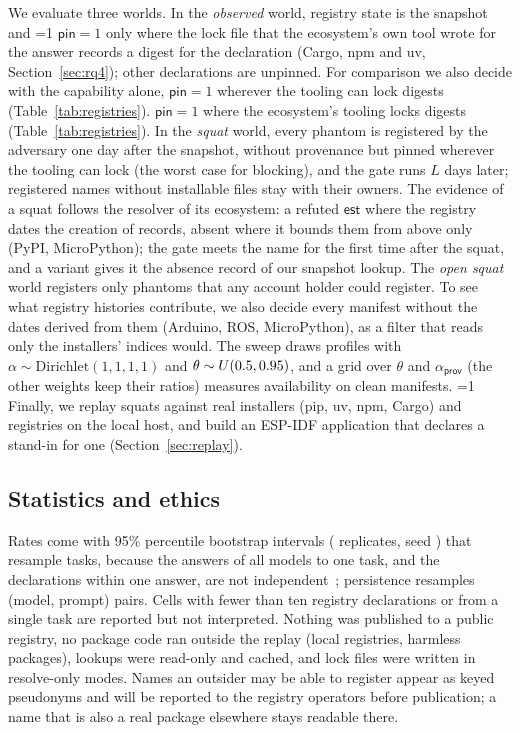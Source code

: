 \documentclass[conference]{IEEEtran}
\providecommand{\rHasReplay}{0}\providecommand{\rHasEspBuild}{0}\providecommand{\rRpNetns}{0}\providecommand{\rValByResponse}{0}\providecommand{\rNoPinBelowTheta}{0}\providecommand{\rHasLock}{0}\providecommand{\rHasAudit}{0}\providecommand{\rHasFamEq}{0}\providecommand{\rMainLock}{0}\providecommand{\rRpLockExec}{0}\providecommand{\rMaxAnsCut}{0}\providecommand{\rReqOnlyUrlPio}{0}\providecommand{\rReqPioSpan}{0}\providecommand{\rHistAfterPThreeUAdmit}{0}\providecommand{\rNGgufIsHorizon}{0}\providecommand{\rRemovedModel}{?}\providecommand{\rRemovedAnswers}{?}\providecommand{\rSqAbsRestOwned}{0}\providecommand{\rSqAbsRest}{0}\providecommand{\rNRemovedModels}{0}\providecommand{\rPostHorizonShiftSame}{0}
\newcommand{\sest}{\mathsf{est}}
\newcommand{\spin}{\mathsf{pin}}
\newcommand{\sprov}{\mathsf{prov}}
\begin{document}
We evaluate three worlds. In the \emph{observed} world, registry state is the snapshot and
\ifnum\rMainLock=1 $\spin=1$ only where the lock file that the ecosystem's own tool wrote for the answer records a
digest for the declaration (Cargo, npm and uv, Section~\ref{sec:rq4}); other declarations are unpinned. For
comparison we also decide with the capability alone, $\spin=1$ wherever the tooling can lock digests
(Table~\ref{tab:registries}). \else $\spin=1$ where the ecosystem's tooling locks digests
(Table~\ref{tab:registries}). \fi In the \emph{squat} world, every phantom is registered by the adversary one
day after the snapshot, without provenance but pinned wherever the tooling can lock (the worst case for blocking),
and the gate runs $L$ days later; registered names without installable files stay with their owners. The evidence of a squat follows the
resolver of its ecosystem: a refuted $\sest$ where the registry dates the creation of records, absent where it bounds
them from above only (PyPI, MicroPython); the gate meets the name for the first time after the squat, and a variant
gives it the absence record of our snapshot lookup. The \emph{open squat} world registers only phantoms that any
account holder could register. To see what registry histories contribute, we also decide every manifest without the
dates derived from them (Arduino, ROS, MicroPython), as a filter that reads only the installers' indices would. The
sweep draws \rSweepN{} profiles with $\alpha\sim\mathrm{Dirichlet}(1,1,1,1)$ and
$\theta\sim U(0.5,0.95)$, and a grid over $\theta$ and $\alpha_{\sprov}$ (the other weights
keep their ratios) measures availability on clean manifests.
\ifnum\rHasReplay=1
Finally, we replay squats against real installers (pip, uv, npm, Cargo) and registries on the local host, and build
an ESP-IDF application that declares a stand-in for one (Section~\ref{sec:replay}).
\fi

\subsection{Statistics and ethics}
Rates come with 95\% percentile bootstrap intervals (\rBootB{} replicates, seed \rSeed) that resample tasks, because
the answers of all models to one task, and the declarations within one answer, are not
independent~\cite{field2007bootstrap}; persistence resamples (model, prompt) pairs. Cells with fewer than ten registry
declarations or from a single task are reported but not interpreted. Nothing was published to a public registry, no
package code ran outside the replay (local registries, harmless packages), lookups were read-only and cached, and
lock files were written in resolve-only modes. Names an outsider may be able to register appear as keyed pseudonyms
and will be reported to the registry operators before publication; a name that is also a real package elsewhere
stays readable there.
\end{document}
